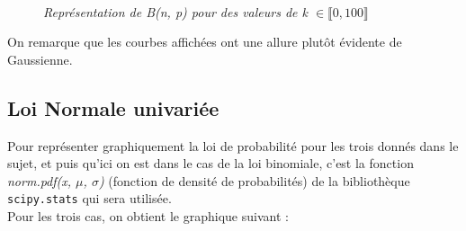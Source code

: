 \documentclass{article}      %
\begin{document}
\begin{figure}[H]
    \centering
    \\
    \textit{Représentation de B(n, p) pour des valeurs de k $\in \llbracket 0, 100 \rrbracket$}
\end{figure}

On remarque que les courbes affichées ont une allure plutôt évidente de Gaussienne.

\subsection{Loi Normale univariée}

Pour représenter graphiquement la loi de probabilité pour les trois donnés dans le sujet, et puis qu’ici on est dans le cas de la loi binomiale, c'est la fonction \textit{norm.pdf(x, $\mu$, $\sigma$)} (fonction de densité de probabilités) de la bibliothèque \texttt{scipy.stats} qui sera utilisée.\\
Pour les trois cas, on obtient le graphique suivant :\\
\end{document}
